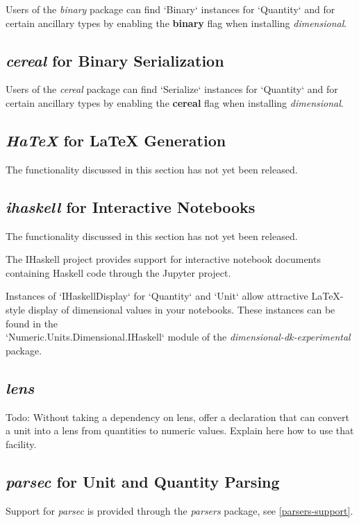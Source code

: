 \documentclass[11pt]{report}
\newcommand{\packagename}[1]{\textit{#1}}
\newcommand{\thispackage}{\packagename{dimensional}}
\newcommand{\experimentalpackage}{\packagename{dimensional-dk-experimental}}
\newcommand{\flag}[1]{\textbf{#1}}
\newcommand{\prerelease}{\begin{framed}
The functionality discussed in this section has not yet been released.
\end{framed}}
\begin{document}
Users of the \packagename{binary} package can find `Binary`
instances for `Quantity` and for certain ancillary types by
enabling the \flag{binary} flag when installing \thispackage{}.

\subsection{\packagename{cereal} for Binary Serialization}

Users of the \packagename{cereal} package can find `Serialize`
instances for `Quantity` and for certain ancillary types by
enabling the \flag{cereal} flag when installing \thispackage{}.

\subsection{\packagename{HaTeX} for \LaTeX{} Generation}

\prerelease{}

\subsection{\packagename{ihaskell} for Interactive Notebooks}

\prerelease{}

The IHaskell project provides support for interactive notebook documents containing
Haskell code through the Jupyter project.

Instances of `IHaskellDisplay` for `Quantity` and `Unit`
allow attractive \LaTeX{}-style display of dimensional values in your notebooks. These
instances can be found in the \\
`Numeric.Units.Dimensional.IHaskell` module of the \experimentalpackage{}
package.

\subsection{\packagename{lens}}

Todo: Without taking a dependency on lens, offer a declaration that can convert a unit into a lens from quantities to numeric values.
Explain here how to use that facility.

\subsection{\packagename{parsec} for Unit and Quantity Parsing}

Support for \packagename{parsec} is provided through the \packagename{parsers} package, see \ref{parsers-support}.
\end{document}
